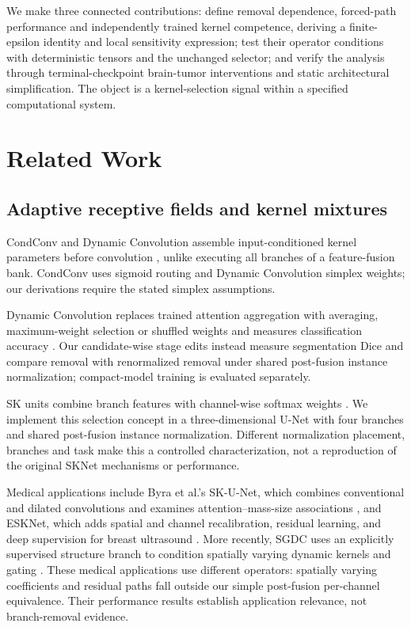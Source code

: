 \documentclass[mathematics,article,submit,pdftex,moreauthors]{Definitions/mdpi}
\begin{document}
We make three connected contributions: define removal dependence, forced-path
performance and independently trained kernel competence, deriving a
finite-epsilon identity and local sensitivity expression; test their operator
conditions with deterministic tensors and the unchanged selector; and verify
the analysis through terminal-checkpoint brain-tumor interventions and static
architectural simplification. The object is a kernel-selection signal within
a specified computational system.

\section{Related Work}
\subsection{Adaptive receptive fields and kernel mixtures}
CondConv and Dynamic Convolution assemble input-conditioned kernel parameters
before convolution \cite{yang2019condconv,chen2020dynamic}, unlike executing
all branches of a feature-fusion bank. CondConv uses sigmoid routing and
Dynamic Convolution simplex weights; our derivations require the stated
simplex assumptions.

Dynamic Convolution replaces trained attention aggregation with averaging,
maximum-weight selection or shuffled weights and measures classification
accuracy \cite{chen2020dynamic}. Our candidate-wise stage edits instead
measure segmentation Dice and compare removal with renormalized removal
under shared post-fusion instance normalization; compact-model training
is evaluated separately.

SK units combine branch features with channel-wise softmax weights
\cite{li2019sknet}. We implement this selection concept in a three-dimensional
U-Net \cite{ronneberger2015unet} with four branches and shared post-fusion
instance normalization. Different normalization placement, branches and task
make this a controlled characterization, not a reproduction of the original
SKNet mechanisms or performance.

Medical applications include Byra et al.'s SK-U-Net, which combines
conventional and dilated convolutions and examines attention--mass-size
associations \cite{byra2020skunet}, and ESKNet, which adds spatial and channel
recalibration, residual learning, and deep supervision for breast ultrasound
\cite{chen2024esknet}. More recently, SGDC uses an explicitly supervised
structure branch to condition spatially varying dynamic kernels and gating
\cite{shi2026sgdc}. These medical applications use different operators:
spatially varying coefficients and residual paths fall outside our simple
post-fusion per-channel equivalence. Their performance results establish
application relevance, not branch-removal evidence.
\end{document}
